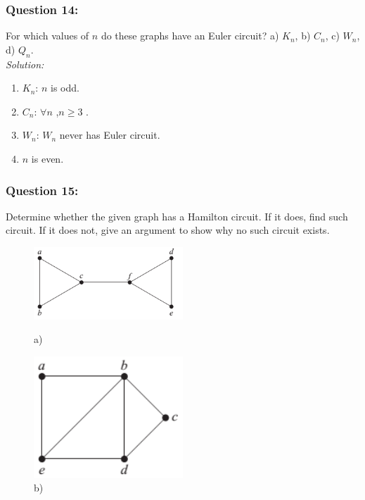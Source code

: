 \documentclass[a4paper]{article}
\begin{document}
	\subsubsection*{Question 14:}
	For which values of $n$ do these graphs have an Euler circuit? a) $K_n$, b) $C_n$, c) $W_n$, d) $Q_n$.\\
	\emph{Solution:}
	\begin{enumerate}[label = \alph*)]
		\item $K_n$: $n$ is odd.
		\item $C_n$: $\forall n$ ,$n \geq 3$ .
		\item $W_n$: $W_n$  never has Euler circuit.
		\item $n$ is even.
	\end{enumerate}
	\subsubsection*{Question 15:}
	Determine whether the given graph has a Hamilton circuit. If it does, find such circuit. If it does not, give an argument to show why no such circuit exists.
	\begin{figure}[H]
		\begin{minipage}{0.5\textwidth}
			\centering
			\includegraphics[width=0.5\textwidth]{tut915_1.png}
			\caption*{a)}
		\end{minipage}
		\begin{minipage}{0.5\textwidth}
			\centering
			\includegraphics[width=0.5\textwidth]{tut915_2.png}
			\caption*{b)}
		\end{minipage}
	\end{figure}
\end{document}
